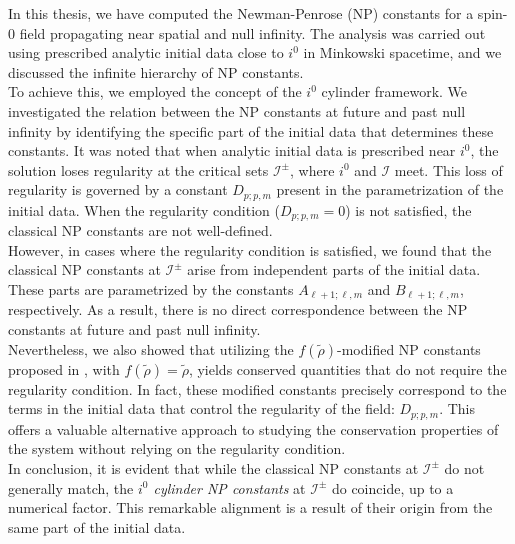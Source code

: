 In this thesis, we have computed the Newman-Penrose (NP) constants for a spin-0 field propagating near spatial and null infinity. The analysis was carried out using prescribed analytic initial data close to $i^0$ in Minkowski spacetime, and we discussed the infinite hierarchy of NP constants. \\

To achieve this, we employed the concept of the $i^0$ cylinder framework. We investigated the relation between the NP constants at future and past null infinity by identifying the specific part of the initial data that determines these constants. It was noted that when analytic initial data is prescribed near $i^0$, the solution loses regularity at the critical sets $\mathcal{I}^{\pm}$, where $i^0$ and $\mathscr{I}$ meet. This loss of regularity is governed by a constant $D_{p;p,m}$ present in the parametrization of the initial data. When the regularity condition ($D_{p;p,m} = 0$) is not satisfied, the classical NP constants are not well-defined. \\

However, in cases where the regularity condition is satisfied, we found that the classical NP constants at $\mathscr{I}^{\pm}$ arise from independent parts of the initial data. These parts are parametrized by the constants $A_{\ell+1;\ell,m}$ and $B_{\ell+1;\ell,m}$, respectively. As a result, there is no direct correspondence between the NP constants at future and past null infinity. \\

Nevertheless, we also showed that utilizing the $f(\tilde{\rho})$-modified NP constants proposed in \cite{Keh21_a}, with $f(\tilde{\rho})=\tilde{\rho}$, yields conserved quantities that do not require the regularity condition. In fact, these modified constants precisely correspond to the terms in the initial data that control the regularity of the field: $D_{p;p,m}$. This offers a valuable alternative approach to studying the conservation properties of the system without relying on the regularity condition. \\

In conclusion, it is evident that while the classical NP constants at $\mathscr{I}^{\pm}$ do not generally match, the \emph{$i^0$ cylinder NP constants} at $\mathscr{I}^{\pm}$ do coincide, up to a numerical factor. This remarkable alignment is a result of their origin from the same part of the initial data.


